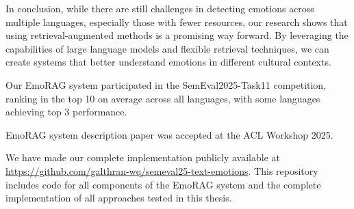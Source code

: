 \documentclass[a4paper,12pt]{extarticle}
\begin{document}
In conclusion, while there are still challenges in detecting emotions across multiple languages, especially those with fewer resources, our research shows that using retrieval-augmented methods is a promising way forward. By leveraging the capabilities of large language models and flexible retrieval techniques, we can create systems that better understand emotions in different cultural contexts.

Our EmoRAG system participated in the SemEval2025-Task11 competition, ranking in the top 10 on average across all languages, with some languages achieving top 3 performance. 

EmoRAG system description paper was accepted at the ACL Workshop 2025.

We have made our complete implementation publicly available at \url{https://github.com/galthran-wq/semeval25-text-emotions}. This repository includes code for all components of the EmoRAG system and the complete implementation of all approaches tested in this thesis.

\printbibliography

\appendix





\end{document}
